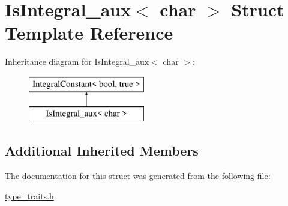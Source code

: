 \hypertarget{struct_is_integral__aux_3_01char_01_4}{}\section{Is\+Integral\+\_\+aux$<$ char $>$ Struct Template Reference}
\label{struct_is_integral__aux_3_01char_01_4}
Inheritance diagram for Is\+Integral\+\_\+aux$<$ char $>$\+:\begin{figure}[H]
\begin{center}
\leavevmode
\includegraphics[height=2.000000cm]{struct_is_integral__aux_3_01char_01_4}
\end{center}
\end{figure}
\subsection*{Additional Inherited Members}


The documentation for this struct was generated from the following file\+:\begin{DoxyCompactItemize}
\item 
\hyperlink{type__traits_8h}{type\+\_\+traits.\+h}\end{DoxyCompactItemize}
